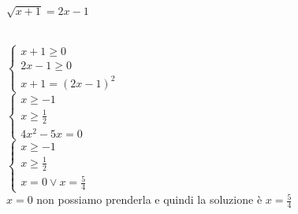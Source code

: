 \documentclass[12pt]{report}
\newcounter{exercise}
\begin{document}
	\begin{assignment}{}{} \quad \\
		$\sqrt{x + 1} = 2x - 1$
		\begin{exercise}{}{} \quad \\
			$\begin{cases}
				x + 1 \geq 0 \\
				2x - 1 \geq 0 \\
				x + 1 = (2x-1)^2
			\end{cases}$ \\
			$\begin{cases}
				x \geq -1 \\
				x \geq \frac{1}{2} \\
				4x^2 - 5x = 0
			\end{cases}$ \\
			$\begin{cases}
				x \geq -1 \\
				x \geq \frac{1}{2} \\
				x = 0 \vee x = \frac{5}{4}
			\end{cases}$ \\
			$x = 0$ non possiamo prenderla e quindi la soluzione è $x = \frac{5}{4}$
		\end{exercise}
	\end{assignment}
\end{document}
